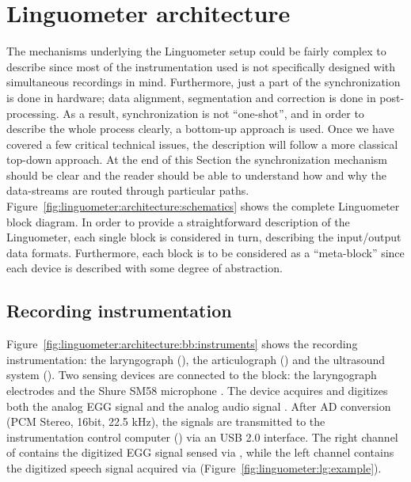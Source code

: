 \section{Linguometer architecture}
\label{ch:linguometer:architecture}
The mechanisms underlying the Linguometer setup could be fairly complex to
describe since most of the instrumentation used is
not specifically designed with simultaneous recordings in mind.
Furthermore, just a part of the synchronization is done in hardware; 
data alignment, segmentation and correction is done in post-processing.
As a result, synchronization is not ``one-shot'', and in order to describe the
whole process clearly, a bottom-up approach is used.
Once we have covered a few critical technical issues, the
description will follow a more classical top-down approach.
At the end of this Section the synchronization mechanism should be clear and 
the reader should be able to understand how and why the data-streams are routed
through particular paths. 
\label{sec:linguometer:architecture:blocks}
Figure~\ref{fig:linguometer:architecture:schematics} shows the complete
Linguometer block diagram.
In order to provide a straightforward description of the Linguometer, each
single block is considered in turn, describing the input/output data formats.
Furthermore, each block is to be considered as a ``meta-block'' since each
device is described with some degree of abstraction.
\subsection{Recording instrumentation}

Figure~\ref{fig:linguometer:architecture:bb:instruments} shows the recording
instrumentation: the laryngograph (), the articulograph () and
the ultrasound system ().
%
Two sensing devices are connected to the  block: the laryngograph
electrodes  and the Shure SM58 microphone .
The  device acquires and digitizes both the analog EGG signal
 and the analog audio signal .
After AD conversion (PCM Stereo, 16bit, 22.5 kHz), the signals are transmitted
to the instrumentation control computer () via an USB 2.0 interface. 
The right channel of  contains the digitized  EGG 
signal sensed via , while the left channel contains the digitized
speech signal acquired via  (Figure~\ref{fig:linguometer:lg:example}).

